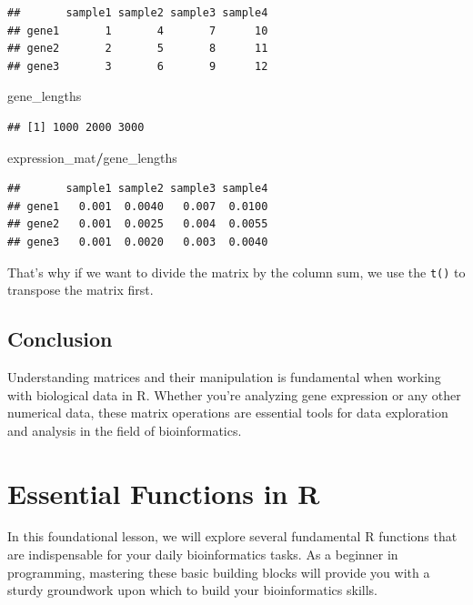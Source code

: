 \documentclass[
]{book}
\newenvironment{Shaded}{\begin{snugshade}}{\end{snugshade}}
\newcommand{\NormalTok}[1]{#1}
\newcommand{\SpecialCharTok}[1]{\textcolor[rgb]{0.81,0.36,0.00}{\textbf{#1}}}
\begin{document}
\begin{verbatim}
##       sample1 sample2 sample3 sample4
## gene1       1       4       7      10
## gene2       2       5       8      11
## gene3       3       6       9      12
\end{verbatim}

\begin{Shaded}
\begin{Highlighting}[]
\NormalTok{gene\_lengths}
\end{Highlighting}
\end{Shaded}

\begin{verbatim}
## [1] 1000 2000 3000
\end{verbatim}

\begin{Shaded}
\begin{Highlighting}[]
\NormalTok{expression\_mat}\SpecialCharTok{/}\NormalTok{gene\_lengths}
\end{Highlighting}
\end{Shaded}

\begin{verbatim}
##       sample1 sample2 sample3 sample4
## gene1   0.001  0.0040   0.007  0.0100
## gene2   0.001  0.0025   0.004  0.0055
## gene3   0.001  0.0020   0.003  0.0040
\end{verbatim}

That's why if we want to divide the matrix by the column sum, we use the \texttt{t()} to transpose the matrix first.

\hypertarget{conclusion-2}{%
\subsection{Conclusion}\label{conclusion-2}}

Understanding matrices and their manipulation is fundamental when working with biological data in R. Whether you're analyzing gene expression or any other numerical data, these matrix operations are essential tools for data exploration and analysis in the field of bioinformatics.

\hypertarget{essential-functions-in-r}{%
\section{Essential Functions in R}\label{essential-functions-in-r}}

In this foundational lesson, we will explore several fundamental R functions that are indispensable for your daily bioinformatics tasks. As a beginner in programming, mastering these basic building blocks will provide you with a sturdy groundwork upon which to build your bioinformatics skills.
\end{document}
